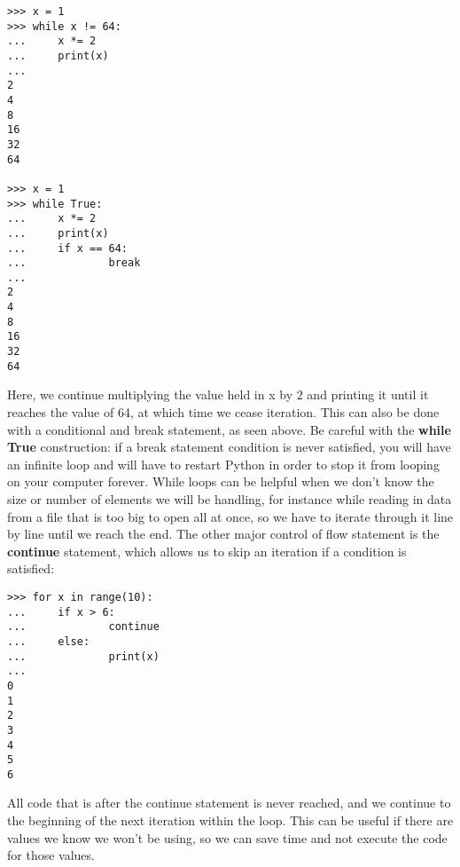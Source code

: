 \documentclass[a4paper,11pt]{article}
\begin{document}
\vspace{3mm}
\begin{lstlisting}
>>> x = 1
>>> while x != 64:
...     x *= 2
...     print(x)
... 
2
4
8
16
32
64

>>> x = 1
>>> while True:
...     x *= 2
...     print(x)
...     if x == 64:
...             break
... 
2
4
8
16
32
64
\end{lstlisting}
\vspace{3mm}

Here, we continue multiplying the value held in x by 2 and printing it until it reaches the value of 64, 
at which time we cease iteration.  This can also be done with a conditional and break statement, as seen 
above.  Be careful with the \textbf{while True} construction: if a break statement condition is never 
satisfied, you will have an infinite loop and will have to restart Python in order to stop it from looping on 
your computer forever.  While loops can be helpful when we don't know the size or number of elements we will 
be handling, for instance while reading in data from a file that is too big to open all at once, so we have 
to iterate through it line by line until we reach the end.  The other major control of flow statement is 
the \textbf{continue} statement, which allows us to skip an iteration if a condition is satisfied:

\vspace{3mm}
\begin{lstlisting}
>>> for x in range(10):
...     if x > 6:
...             continue
...     else:
...             print(x)
... 
0
1
2
3
4
5
6
\end{lstlisting}
\vspace{3mm}

All code that is after the continue statement is never reached, and we continue to the beginning of the 
next iteration within the loop.  This can be useful if there are values we know we won't be using, so 
we can save time and not execute the code for those values.  \par
\end{document}
